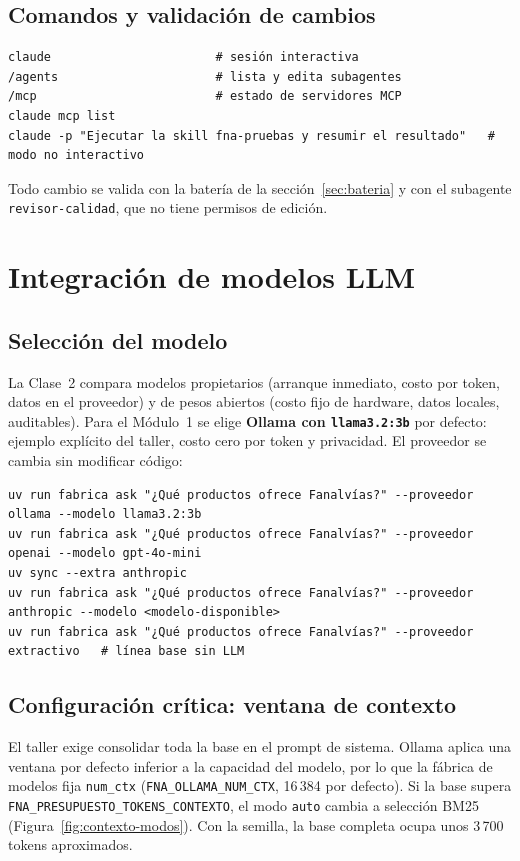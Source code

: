 \section{Comandos y validación de cambios}
\begin{lstlisting}[style=ps]
claude                       # sesión interactiva
/agents                      # lista y edita subagentes
/mcp                         # estado de servidores MCP
claude mcp list
claude -p "Ejecutar la skill fna-pruebas y resumir el resultado"   # modo no interactivo
\end{lstlisting}
Todo cambio se valida con la batería de la sección~\ref{sec:bateria} y con el subagente
\texttt{revisor-calidad}, que no tiene permisos de edición.

\chapter{Integración de modelos LLM}\label{cap:llm}

\section{Selección del modelo}
La Clase~2 compara modelos propietarios (arranque inmediato, costo por token, datos en el proveedor) y de pesos
abiertos (costo fijo de hardware, datos locales, auditables). Para el Módulo~1 se elige \textbf{Ollama con
\texttt{llama3.2:3b}} por defecto: ejemplo explícito del taller, costo cero por token y privacidad. El
proveedor se cambia sin modificar código:
\begin{lstlisting}[style=ps]
uv run fabrica ask "¿Qué productos ofrece Fanalvías?" --proveedor ollama --modelo llama3.2:3b
uv run fabrica ask "¿Qué productos ofrece Fanalvías?" --proveedor openai --modelo gpt-4o-mini
uv sync --extra anthropic
uv run fabrica ask "¿Qué productos ofrece Fanalvías?" --proveedor anthropic --modelo <modelo-disponible>
uv run fabrica ask "¿Qué productos ofrece Fanalvías?" --proveedor extractivo   # línea base sin LLM
\end{lstlisting}

\section{Configuración crítica: ventana de contexto}
El taller exige consolidar toda la base en el prompt de sistema. Ollama aplica una ventana por defecto
inferior a la capacidad del modelo, por lo que la fábrica de modelos fija \texttt{num\_ctx}
(\texttt{FNA\_OLLAMA\_NUM\_CTX}, 16\,384 por defecto). Si la base supera
\texttt{FNA\_PRESUPUESTO\_TOKENS\_CONTEXTO}, el modo \texttt{auto} cambia a selección BM25
(Figura~\ref{fig:contexto-modos}). Con la semilla, la base completa ocupa unos 3\,700 tokens aproximados.

